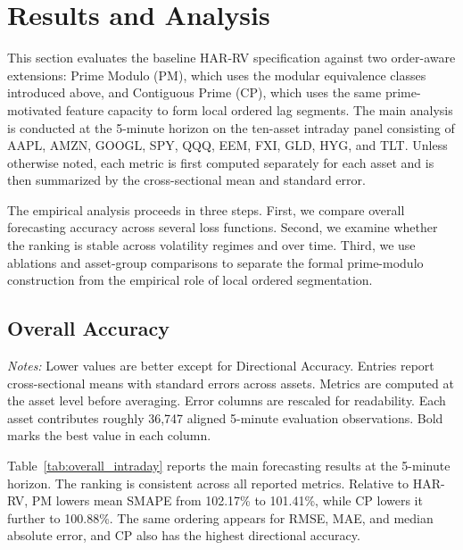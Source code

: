 \documentclass[11pt,a4paper]{article}
\begin{document}
\section{Results and Analysis}
\captionsetup{font=small,labelfont=bf,labelsep=period,hypcap=false}

\noindent
This section evaluates the baseline HAR-RV specification against two order-aware extensions: Prime Modulo (PM), which uses the modular equivalence classes introduced above, and Contiguous Prime (CP), which uses the same prime-motivated feature capacity to form local ordered lag segments. The main analysis is conducted at the 5-minute horizon on the ten-asset intraday panel consisting of AAPL, AMZN, GOOGL, SPY, QQQ, EEM, FXI, GLD, HYG, and TLT. Unless otherwise noted, each metric is first computed separately for each asset and is then summarized by the cross-sectional mean and standard error.

\noindent
The empirical analysis proceeds in three steps. First, we compare overall forecasting accuracy across several loss functions. Second, we examine whether the ranking is stable across volatility regimes and over time. Third, we use ablations and asset-group comparisons to separate the formal prime-modulo construction from the empirical role of local ordered segmentation.

\subsection{Overall Accuracy}

{\renewcommand{\thetable}{1A}
\begin{center}
\label{tab:overall_intraday}
\small
\renewcommand{\arraystretch}{1.15}
\setlength{\tabcolsep}{6pt}
\resizebox{0.98\textwidth}{!}{}

\vspace{0.1cm}
\footnotesize \parbox{0.92\textwidth}{\textit{Notes:} Lower values are better except for Directional Accuracy. Entries report cross-sectional means with standard errors across assets. Metrics are computed at the asset level before averaging. Error columns are rescaled for readability. Each asset contributes roughly 36,747 aligned 5-minute evaluation observations. Bold marks the best value in each column.}
\end{center}}

\noindent
Table~\ref{tab:overall_intraday} reports the main forecasting results at the 5-minute horizon. The ranking is consistent across all reported metrics. Relative to HAR-RV, PM lowers mean SMAPE from 102.17\% to 101.41\%, while CP lowers it further to 100.88\%. The same ordering appears for RMSE, MAE, and median absolute error, and CP also has the highest directional accuracy.
\end{document}
